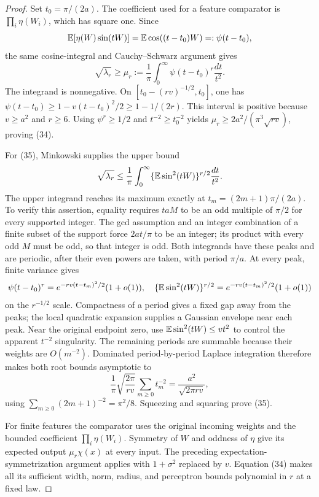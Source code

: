 \begin{proof}
Set $t_0=\pi/(2a)$. The coefficient used for a feature comparator is
$\prod_i\eta(W_i)$, which has square one. Since
\[
 \mathbb E[\eta(W)\sin(tW)]=\mathbb E\cos((t-t_0)W)=:\psi(t-t_0),
\]
the same cosine-integral and Cauchy--Schwarz argument gives
\[
 \sqrt{\lambda_r}\ge\mu_r:=\frac1\pi\int_0^\infty
                             \psi(t-t_0)^r\frac{dt}{t^2}.
\]
The integrand is nonnegative. On
$[t_0-(rv)^{-1/2},t_0]$, one has
$\psi(t-t_0)\ge1-v(t-t_0)^2/2\ge1-1/(2r)$.
This interval is positive because $v\ge a^2$ and $r\ge6$.
Using $\psi^r\ge1/2$ and $t^{-2}\ge t_0^{-2}$ yields
$\mu_r\ge2a^2/(\pi^3\sqrt{rv})$, proving (34).

For (35), Minkowski supplies the upper bound
\[
 \sqrt{\lambda_r}\le\frac1\pi\int_0^\infty
                \{\mathbb E\sin^2(tW)\}^{r/2}\frac{dt}{t^2}.
\]
The upper integrand reaches its maximum exactly at
$t_m=(2m+1)\pi/(2a)$. To verify this assertion, equality requires
$t aM$ to be an odd multiple of $\pi/2$ for every supported integer.
The gcd assumption and an integer combination of a finite subset of the
support force $2at/\pi$ to be an integer; its product with every odd
$M$ must be odd, so that integer is odd.
Both integrands have these peaks and are periodic, after their even
powers are taken, with period $\pi/a$. At every peak, finite variance gives
\[
 \psi(t-t_0)^r=e^{-rv(t-t_m)^2/2}(1+o(1)),\quad
 \{\mathbb E\sin^2(tW)\}^{r/2}=e^{-rv(t-t_m)^2/2}(1+o(1))
\]
on the $r^{-1/2}$ scale. Compactness of a period gives a fixed gap
away from the peaks; the local quadratic expansion supplies a Gaussian
envelope near each peak. Near the original endpoint zero, use
$\mathbb E\sin^2(tW)\le vt^2$ to control the apparent $t^{-2}$ singularity.
The remaining periods are summable because their weights are $O(m^{-2})$.
Dominated period-by-period Laplace integration therefore makes both root
bounds asymptotic to
\[
 \frac1\pi\sqrt{\frac{2\pi}{rv}}
          \sum_{m\ge0}t_m^{-2}
 =\frac{a^2}{\sqrt{2\pi rv}},
\]
using $\sum_{m\ge0}(2m+1)^{-2}=\pi^2/8$. Squeezing and squaring
prove (35).

For finite features the comparator uses the original incoming weights
and the bounded coefficient $\prod_i\eta(W_i)$. Symmetry of $W$ and
oddness of $\eta$ give its expected output $\mu_r\chi(x)$ at every
input. The preceding expectation-symmetrization argument applies with
$1+\sigma^2$ replaced by $v$. Equation (34) makes all its sufficient
width, norm, radius, and perceptron bounds polynomial in $r$ at a fixed law.
\end{proof}

